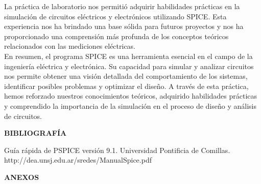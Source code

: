 \documentclass[12pt]{article}
\begin{document}
	La práctica de laboratorio nos permitió adquirir habilidades prácticas en la simulación de circuitos eléctricos y electrónicos utilizando SPICE. Esta experiencia nos ha brindado una base sólida para futuros proyectos y nos ha proporcionado una comprensión más profunda de los conceptos teóricos relacionados con las mediciones eléctricas.\\
	
	En resumen, el programa SPICE es una herramienta esencial en el campo de la ingeniería eléctrica y electrónica. Su capacidad para simular y analizar circuitos nos permite obtener una visión detallada del comportamiento de los sistemas, identificar posibles problemas y optimizar el diseño. A través de esta práctica, hemos reforzado nuestros conocimientos teóricos, adquirido habilidades prácticas y comprendido la importancia de la simulación en el proceso de diseño y análisis de circuitos.\\
	
	\newpage
	
	\begin{center}
		\textbf{\large BIBLIOGRAFÍA}\\
	\end{center}
	
	Guía rápida de PSPICE versión 9.1. Universidad Pontificia de Comillas.\\
	http://dea.unsj.edu.ar/sredes/ManualSpice.pdf
	
	\newpage
	
	\begin{center}
		\textbf{\large ANEXOS}\\
	\end{center}
	
\end{document}
